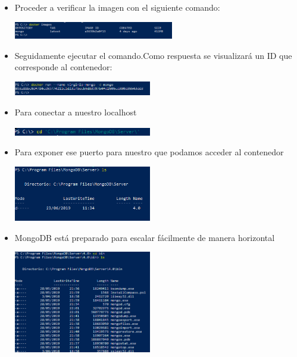 \documentclass[%
 reprint,
 amsmath,amssymb,
 aps,
]{revtex4-1}
\begin{document}
\begin{itemize}
\begin{center}
		\end{center}	
                     \item Proceder a verificar la imagen con el siguiente comando:
                     \begin{center}
		\includegraphics[width=7cm]{./Imagenes/15}
		\end{center}	
                     \item Seguidamente ejecutar el comando.Como respuesta se visualizará un ID que corresponde al contenedor:
                     \begin{center}
		\includegraphics[width=6cm]{./Imagenes/16}
		\end{center}	
                     \item Para conectar  a nuestro localhost 
                     \begin{center}
		\includegraphics[width=6cm]{./Imagenes/17}
		\end{center}	
                     \item Para exponer ese puerto para nuestro que podamos  acceder al contenedor
                     \begin{center}
		\includegraphics[width=6cm]{./Imagenes/18}
		\end{center}	
                     \item MongoDB está preparado para escalar fácilmente de manera horizontal
                     \begin{center}
		\includegraphics[width=6cm]{./Imagenes/20}

\end{center}
\end{itemize}
\end{document}
